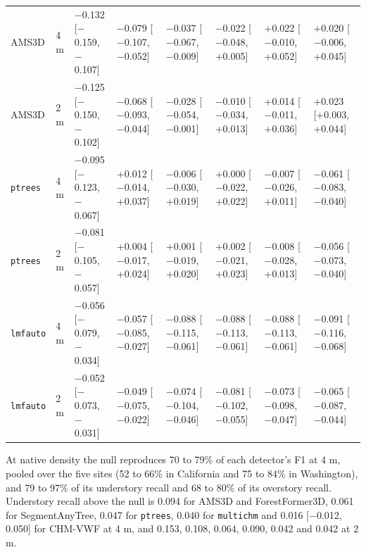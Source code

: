 \documentclass[10pt,a4paper]{article}
\begin{document}
{\begin{xltabular}{\textwidth}{llLLLLLL}
AMS3D & 4 m & $-$0.132 [$-$0.159, $-$0.107] & $-$0.079 [$-$0.107, $-$0.052] & $-$0.037 [$-$0.067, $-$0.009] & $-$0.022 [$-$0.048, +0.005] & +0.022 [$-$0.010, +0.052] & +0.020 [$-$0.006, +0.045] \\
AMS3D & 2 m & $-$0.125 [$-$0.150, $-$0.102] & $-$0.068 [$-$0.093, $-$0.044] & $-$0.028 [$-$0.054, $-$0.001] & $-$0.010 [$-$0.034, +0.013] & +0.014 [$-$0.011, +0.036] & +0.023 [+0.003, +0.044] \\
\texttt{ptrees} & 4 m & $-$0.095 [$-$0.123, $-$0.067] & +0.012 [$-$0.014, +0.037] & $-$0.006 [$-$0.030, +0.019] & +0.000 [$-$0.022, +0.022] & $-$0.007 [$-$0.026, +0.011] & $-$0.061 [$-$0.083, $-$0.040] \\
\texttt{ptrees} & 2 m & $-$0.081 [$-$0.105, $-$0.057] & +0.004 [$-$0.017, +0.024] & +0.001 [$-$0.019, +0.020] & +0.002 [$-$0.021, +0.023] & $-$0.008 [$-$0.028, +0.013] & $-$0.056 [$-$0.073, $-$0.040] \\
\texttt{lmfauto} & 4 m & $-$0.056 [$-$0.079, $-$0.034] & $-$0.057 [$-$0.085, $-$0.027] & $-$0.088 [$-$0.115, $-$0.061] & $-$0.088 [$-$0.113, $-$0.061] & $-$0.088 [$-$0.113, $-$0.061] & $-$0.091 [$-$0.116, $-$0.068] \\
\texttt{lmfauto} & 2 m & $-$0.052 [$-$0.073, $-$0.031] & $-$0.049 [$-$0.075, $-$0.022] & $-$0.074 [$-$0.104, $-$0.046] & $-$0.081 [$-$0.102, $-$0.055] & $-$0.073 [$-$0.098, $-$0.047] & $-$0.065 [$-$0.087, $-$0.044] \\
\end{xltabular}
}

At native density the null reproduces 70 to 79\% of each detector's F1 at 4 m,
pooled over the five sites (52 to 66\% in California and 75 to 84\% in
Washington), and 79 to 97\% of its understory recall and 68 to 80\% of its
overstory recall. Understory recall above the null is 0.094 for AMS3D and
ForestFormer3D, 0.061 for SegmentAnyTree, 0.047 for \texttt{ptrees}, 0.040 for
\texttt{multichm} and 0.016 [$-$0.012, 0.050] for CHM-VWF at 4 m, and 0.153, 0.108,
0.064, 0.090, 0.042 and 0.042 at 2 m.
\end{document}
